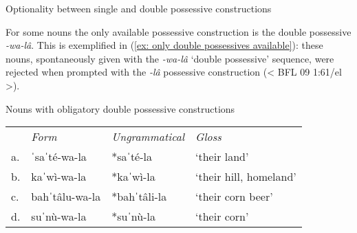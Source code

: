 \ea\label{ex: optionality between single possesisve and double poasessive}
{Optionality between single and double possessive constructions}

    \label{ex: optionality between single possesisve and double poasessivea}
        \label{ex: optionality between single possesisve and double poasessiveb}
            \label{ex: optionality between single possesisve and double poasessivec}
    \z
\z

For some nouns the only available possessive construction is the double possessive \textit{-wa-lâ}. This is exemplified in (\ref{ex: only double possessives available}): these nouns, spontaneously given with the \textit{-wa-lâ} ‘double possessive’ sequence, were rejected when prompted with the \textit{-lâ} possessive construction (< BFL 09 1:61/el >).

\ea\label{ex: only double possessives available}
{Nouns with obligatory double possessive constructions}\\

\begin{tabular}{llll}
        & \textit{Form} &  \textit{Ungrammatical} & \textit{Gloss}\\
     a.& ˈsaˈté-wa-la & *saˈté-la & `their land'\\
     b.& kaˈwì-wa-la  & *kaˈwì-la &   `their hill, homeland'\\
     c.& bahˈtâlu-wa-la &  *bahˈtâli-la & `their corn beer' \\
     d.& suˈnù-wa-la & *suˈnù-la  & `their corn'\\
\end{tabular}
    \z


